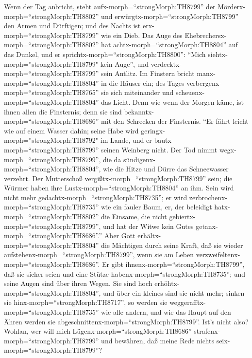  Wenn der Tag anbricht, steht
aufx-morph=``strongMorph:TH8799'' der
Mörderx-morph=``strongMorph:TH8802'' und
erwürgtx-morph=``strongMorph:TH8799'' den Armen und Dürftigen; und des
Nachts ist erx-morph=``strongMorph:TH8799'' wie ein Dieb. 
Das Auge des Ehebrechersx-morph=``strongMorph:TH8802'' hat
achtx-morph=``strongMorph:TH8804'' auf das Dunkel, und er
sprichtx-morph=``strongMorph:TH8800'': ``Mich
siehtx-morph=''strongMorph:TH8799" kein Auge'', und
verdecktx-morph=``strongMorph:TH8799'' sein Antlitz.  Im
Finstern bricht manx-morph=``strongMorph:TH8804'' in die Häuser ein; des
Tages verbergenx-morph=``strongMorph:TH8765'' sie sich miteinander und
scheuenx-morph=``strongMorph:TH8804'' das Licht.  Denn wie
wenn der Morgen käme, ist ihnen allen die Finsternis; denn sie sind
bekanntx-morph=``strongMorph:TH8686'' mit den Schrecken der Finsternis.
 ``Er fährt leicht wie auf einem Wasser dahin; seine Habe
wird geringx-morph=''strongMorph:TH8792" im Lande, und er
bautx-morph=``strongMorph:TH8799'' seinen Weinberg nicht. 
Der Tod nimmt wegx-morph=``strongMorph:TH8799'', die da
sündigenx-morph=``strongMorph:TH8804'', wie die Hitze und Dürre das
Schneewasser verzehrt.  Der Mutterschoß
vergißtx-morph=``strongMorph:TH8799'' sein; die Würmer haben ihre
Lustx-morph=``strongMorph:TH8804'' an ihm. Sein wird nicht mehr
gedachtx-morph=``strongMorph:TH8735''; er wird
zerbrochenx-morph=``strongMorph:TH8735'' wie ein fauler Baum,
 er, der beleidigt hatx-morph=``strongMorph:TH8802'' die
Einsame, die nicht gebiertx-morph=``strongMorph:TH8799'', und hat der
Witwe kein Gutes getanx-morph=``strongMorph:TH8686''.'' 
Aber Gott erhältx-morph=``strongMorph:TH8804'' die Mächtigen durch seine
Kraft, daß sie wieder aufstehenx-morph=``strongMorph:TH8799'', wenn sie
am Leben verzweifeltenx-morph=``strongMorph:TH8686''.  Er
gibt ihnenx-morph=``strongMorph:TH8799'', daß sie sicher seien und eine
Stütze habenx-morph=``strongMorph:TH8735''; und seine Augen sind über
ihren Wegen.  Sie sind hoch
erhöhtx-morph=``strongMorph:TH8804'', und über ein kleines sind sie
nicht mehr; sinken sie hinx-morph=``strongMorph:TH8717'', so werden sie
weggerafftx-morph=``strongMorph:TH8735'' wie alle andern, und wie das
Haupt auf den Ähren werden sie
abgeschnittenx-morph=``strongMorph:TH8799''.  Ist's nicht
also? Wohlan, wer will mich Lügenx-morph=``strongMorph:TH8686''
strafenx-morph=``strongMorph:TH8799'' und bewähren, daß meine Rede
nichts seix-morph=``strongMorph:TH8799''?

